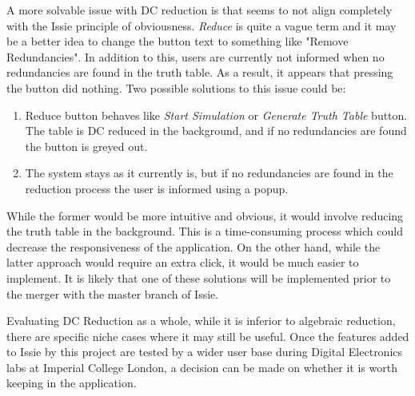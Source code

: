 A more solvable issue with DC reduction is that seems to not align completely with the Issie principle of obviousness. \textit{Reduce} is quite a vague term and it may be a better idea to change the button text to something like "Remove Redundancies". In addition to this, users are currently not informed when no redundancies are found in the truth table. As a result, it appears that pressing the button did nothing. Two possible solutions to this issue could be:
\begin{enumerate}
    \item Reduce button behaves like \textit{Start Simulation} or \textit{Generate Truth Table} button. The table is DC reduced in the background, and if no redundancies are found the button is greyed out.
    \item The system stays as it currently is, but if no redundancies are found in the reduction process the user is informed using a popup.
\end{enumerate}
While the former would be more intuitive and obvious, it would involve reducing the truth table in the background. This is a time-consuming process which could decrease the responsiveness of the application. On the other hand, while the latter approach would require an extra click, it would be much easier to implement. It is likely that one of these solutions will be implemented prior to the merger with the master branch of Issie.

Evaluating DC Reduction as a whole, while it is inferior to algebraic reduction, there are specific niche cases where it may still be useful. Once the features added to Issie by this project are tested by a wider user base during Digital Electronics labs at Imperial College London, a decision can be made on whether it is worth keeping in the application.

